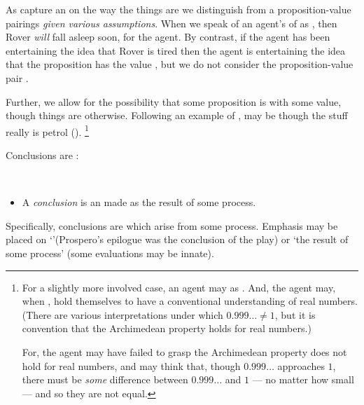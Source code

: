 \begin{note}
  As  capture an \agpe{} on the way the things are we distinguish  from a proposition-value pairings \emph{given various assumptions}.
  When we speak of an agent's \evalN{} of  as , then Rover \emph{will} fall asleep soon, for the agent.
  By contrast, if the agent has been entertaining the idea that Rover is tired then the agent is entertaining the idea that the proposition  has the value , but we do not consider the proposition-value pair .

  Further, we allow for the possibility that some proposition is  with some value, though things are otherwise.
  Following an example of \citeauthor{Williams:1979wi},  may be \eval{}  though the stuff really is petrol (\citeyear[18]{Williams:1979wi}).%
  \footnote{
    For a slightly more involved case, an agent may \eval{}  as .
    And, the agent may, when \evaling{}, hold themselves to have a conventional understanding of real numbers.
    (There are various interpretations under which \(0.999\dots \ne 1\), but it is convention that the Archimedean property holds for real numbers.)

    For, the agent may have failed to grasp the Archimedean property does not hold for real numbers, and may think that, though \(0.999\dots\) approaches \(1\), there must be \emph{some} difference between \(0.999\dots\) and \(1\) --- no matter how small --- and so they are not equal.
  }
\end{note}

\begin{note}
  Conclusions are \evalN{}:
  \begin{definition}
    \label{assu:concluding:pvp}
    \mbox{ }
    \vspace{-\baselineskip}
    \begin{itemize}
    \item
      A \emph{conclusion} is an \evalN{} made as the result of some process.
    \end{itemize}
    \vspace{-\baselineskip}
  \end{definition}

  Specifically, conclusions are \evalN{} which arise from some process.
  Emphasis may be placed on `\evalN{}'(Prospero's epilogue was the conclusion of the play) or `the result of some process' (some evaluations may be innate).
\end{note}

